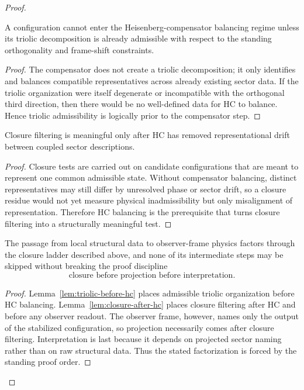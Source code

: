 \begin{proof}
\begin{lemma}
\label{lem:triolic-before-hc}
A configuration cannot enter the Heisenberg-compensator balancing regime unless
its triolic decomposition is already admissible with respect to the standing
orthogonality and frame-shift constraints.
\end{lemma}

\begin{proof}
The compensator does not create a triolic decomposition; it only identifies and
balances compatible representatives across already existing sector data. If the
triolic organization were itself degenerate or incompatible with the orthogonal
third direction, then there would be no well-defined data for HC to balance.
Hence triolic admissibility is logically prior to the compensator step.
\end{proof}

\begin{lemma}
\label{lem:closure-after-hc}
Closure filtering is meaningful only after HC has removed representational drift
between coupled sector descriptions.
\end{lemma}

\begin{proof}
Closure tests are carried out on candidate configurations that are meant to
represent one common admissible state. Without compensator balancing, distinct
representatives may still differ by unresolved phase or sector drift, so a
closure residue would not yet measure physical inadmissibility but only
misalignment of representation. Therefore HC balancing is the prerequisite that
turns closure filtering into a structurally meaningful test.
\end{proof}

\begin{proposition}
\label{prop:closure-ladder}
The passage from local structural data to observer-frame physics factors through
the closure ladder described above, and none of its intermediate steps may be
skipped without breaking the proof discipline
\[
\text{closure before projection before interpretation}.
\]
\end{proposition}

\begin{proof}
Lemma~\ref{lem:triolic-before-hc} places admissible triolic organization before
HC balancing. Lemma~\ref{lem:closure-after-hc} places closure filtering after
HC and before any observer readout. The observer frame, however, names only the
output of the stabilized configuration, so projection necessarily comes after
closure filtering. Interpretation is last because it depends on projected
sector naming rather than on raw structural data. Thus the stated factorization
is forced by the standing proof order.
\end{proof}


\end{proof}
